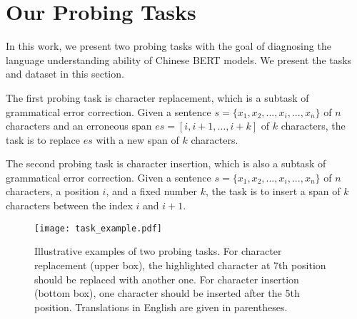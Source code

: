 \documentclass[11pt]{article}
\begin{document}
\section{Our Probing Tasks}
In this work, we present two probing tasks with the goal of diagnosing the language understanding ability of Chinese BERT models. We present the tasks and dataset in this section.

The first probing task is character replacement, which is a subtask of grammatical error correction.
Given a sentence $s=\{x_1, x_2, ..., x_i, ..., x_n\}$ of $n$ characters and an erroneous span $es=[i, i+1, ..., i+k]$ of $k$ characters, the task is to replace $es$ with a new span of $k$ characters. 


The second probing task is character insertion, which is also a subtask of grammatical error correction.
Given a sentence $s=\{x_1, x_2, ..., x_i, ..., x_n\}$ of $n$ characters, a position $i$, and a fixed number $k$, the task is to insert a span of $k$ characters between the index $i$ and $i+1$.
\begin{figure}[h]
     \centering
     \texttt{[image: task\_example.pdf]}
     \caption{Illustrative examples of two probing tasks. For  character replacement (upper box), the highlighted character at 7th position should be replaced with another one. For character insertion (bottom box),  one character should be inserted after the 5th position. Translations in English are given in parentheses.}
     \label{fig:task_example}
\end{figure}



\end{document}
